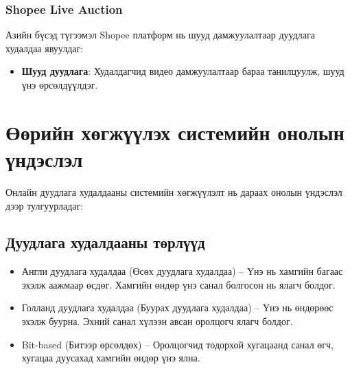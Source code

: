 \subsubsection{Shopee Live Auction}
Азийн бүсэд түгээмэл Shopee \cite{shopeeliveauction} платформ нь шууд дамжуулалтаар дуудлага худалдаа явуулдаг:

\begin{itemize}
    \item \textbf{Шууд дуудлага}: Худалдагчид видео дамжуулалтаар бараа танилцуулж, шууд үнэ өрсөлдүүлдэг.

\end{itemize}
\section{Өөрийн хөгжүүлэх системийн онолын үндэслэл}
Онлайн дуудлага худалдааны системийн хөгжүүлэлт нь дараах онолын үндэслэл дээр тулгуурладаг:

\subsection{Дуудлага худалдааны төрлүүд}
\begin{itemize}
\item  Англи дуудлага худалдаа \cite{aljaf2016online} (Өсөх дуудлага худалдаа) – Үнэ нь хамгийн багаас эхэлж аажмаар өсдөг. Хамгийн өндөр үнэ санал болгосон нь ялагч болдог.

\item  Голланд дуудлага худалдаа (Буурах дуудлага худалдаа) – Үнэ нь өндөрөөс эхэлж буурна. Эхний санал хүлээн авсан оролцогч ялагч болдог.
\item Bit-based (Битээр өрсөлдөх) – Оролцогчид тодорхой хугацаанд санал өгч, хугацаа дуусахад хамгийн өндөр үнэ ялна.
\end{itemize}



